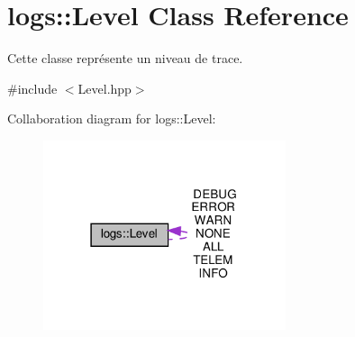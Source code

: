 \hypertarget{classlogs_1_1Level}{}\section{logs\+:\+:Level Class Reference}
\label{classlogs_1_1Level}


Cette classe représente un niveau de trace.  




{\ttfamily \#include $<$Level.\+hpp$>$}



Collaboration diagram for logs\+:\+:Level\+:
\nopagebreak
\begin{figure}[H]
\begin{center}
\leavevmode
\includegraphics[width=202pt]{classlogs_1_1Level__coll__graph}
\end{center}
\end{figure}
